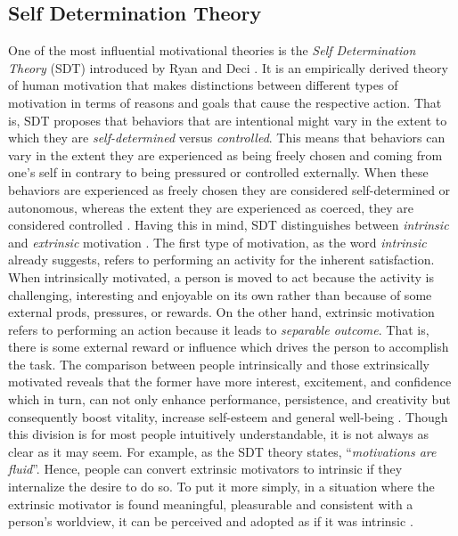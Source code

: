 \subsection{Self Determination Theory}
One of the most influential motivational theories is the \textit{Self Determination Theory} (SDT) introduced by Ryan and Deci \cite{deci1994promoting, ryan2000self,ryan2000intrinsic, deci2000and}. It is an empirically derived theory of human motivation that makes distinctions between different types of motivation in terms of reasons and goals that cause the respective action. That is, SDT proposes that behaviors that are intentional might vary in the extent to which they are \textit{self-determined} versus \textit{controlled}. This means that behaviors can vary in the extent they are experienced as being freely chosen and coming from one's self in contrary to being pressured or controlled externally. When these behaviors are experienced as freely chosen they are considered self-determined or autonomous, whereas the extent they are experienced as coerced, they are considered controlled \cite{deci1994promoting}. Having this in mind, SDT distinguishes between \textit{intrinsic} and \textit{extrinsic} motivation \cite{ryan2000intrinsic}. The first type of motivation, as the word \textit{intrinsic} already suggests, refers to performing an activity for the inherent satisfaction. When intrinsically motivated, a person is moved to act because the activity is challenging, interesting and enjoyable on its own rather than because of some external prods, pressures, or rewards. On the other hand, extrinsic motivation refers to performing an action because it leads to \textit{separable outcome}. That is, there is some external reward or influence which drives the person to accomplish the task. The comparison between people intrinsically and those extrinsically motivated reveals that the former have more interest, excitement, and confidence which in turn, can not only enhance performance, persistence, and creativity but consequently boost vitality, increase self-esteem and general well-being \cite{ryan2000self}. Though this division is for most people intuitively understandable, it is not always as clear as it may seem. For example, as the SDT theory states, ``\textit{motivations are fluid}''. Hence, people can convert extrinsic motivators to intrinsic if they internalize the desire to do so. To put it more simply, in a situation where the extrinsic motivator is found meaningful, pleasurable and consistent with a person's worldview, it can be perceived and adopted as if it was intrinsic \cite{zichermann2012}.
